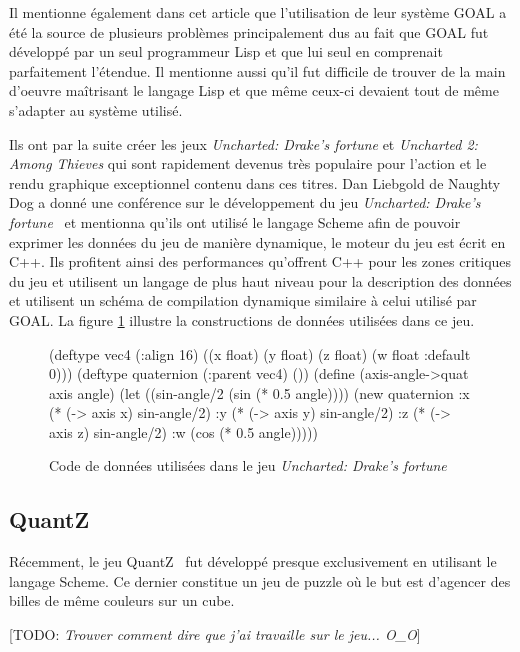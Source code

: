 \documentclass[12pt,oneside,letterpaper,francais]{book}
\newcommand{\todo}[1]{[TODO: {\it #1}]}
\begin{document}
Il mentionne également dans cet article que l'utilisation de leur
système GOAL a été la source de plusieurs problèmes principalement dus
au fait que GOAL fut développé par un seul programmeur Lisp et que lui
seul en comprenait parfaitement l'étendue. Il mentionne aussi qu'il
fut difficile de trouver de la main d'oeuvre maîtrisant le langage
Lisp et que même ceux-ci devaient tout de même s'adapter au système
utilisé.

Ils ont par la suite créer les jeux \textit{Uncharted: Drake's
  fortune} et \textit{Uncharted 2: Among Thieves} qui sont rapidement
devenus très populaire pour l'action et le rendu graphique
exceptionnel contenu dans ces titres. Dan Liebgold de Naughty Dog a
donné une conférence sur le développement du jeu \textit{Uncharted:
  Drake's fortune}~\cite{ND_DRAKE} et mentionna qu'ils ont utilisé le
langage Scheme afin de pouvoir exprimer les données du jeu de manière
dynamique, le moteur du jeu est écrit en C++. Ils profitent ainsi des
performances qu'offrent C++ pour les zones critiques du jeu et
utilisent un langage de plus haut niveau pour la description des
données et utilisent un schéma de compilation dynamique similaire à
celui utilisé par GOAL. La figure \ref{Rev:Drake} illustre la
constructions de données utilisées dans ce jeu.

\begin{figure}[htb!]
  \begin{schemecode}
(deftype vec4 (:align 16)
  ((x float) (y float)
   (z float) (w float :default 0)))
(deftype quaternion (:parent vec4) ())
(define (axis-angle->quat axis angle)
 (let ((sin-angle/2 (sin (* 0.5 angle))))
  (new quaternion
       :x (* (-> axis x) sin-angle/2)
       :y (* (-> axis y) sin-angle/2)
       :z (* (-> axis z) sin-angle/2)
       :w (cos (* 0.5 angle)))))
  \end{schemecode}
  \caption{Code de données utilisées dans le jeu \textit{Uncharted:
      Drake's fortune}~\cite{ND_DRAKE}}
  \label{Rev:Drake}
\end{figure}


\subsection{QuantZ}
Récemment, le jeu QuantZ~\cite{Quantz} fut développé presque
exclusivement en utilisant le langage Scheme. Ce dernier constitue un
jeu de puzzle où le but est d'agencer des billes de même couleurs sur
un cube. 

\todo{Trouver comment dire que j'ai travaille sur le jeu... O\_O}
\end{document}
